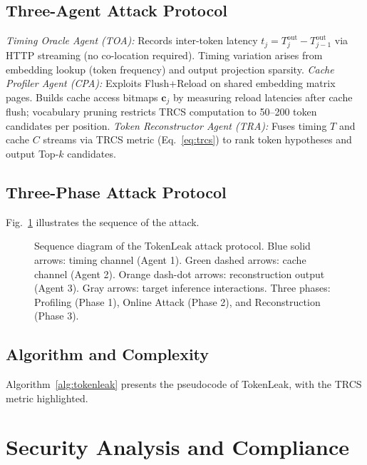 \documentclass[conference,10pt,twocolumn]{IEEEtran}
\begin{document}
\subsection{Three-Agent Attack Protocol}
\emph{Timing Oracle Agent (TOA):} Records inter-token latency $t_j = T_j^{\mathrm{out}} - T_{j-1}^{\mathrm{out}}$ via HTTP streaming (no co-location required). Timing variation arises from embedding lookup (token frequency) and output projection sparsity.
\emph{Cache Profiler Agent (CPA):} Exploits Flush+Reload on shared embedding matrix pages. Builds cache access bitmaps $\mathbf{c}_j$ by measuring reload latencies after cache flush; vocabulary pruning restricts TRCS computation to 50--200 token candidates per position.
\emph{Token Reconstructor Agent (TRA):} Fuses timing $T$ and cache $C$ streams via TRCS metric (Eq.~\ref{eq:trcs}) to rank token hypotheses and output Top-$k$ candidates.
\subsection{Three-Phase Attack Protocol}
Fig.~\ref{fig:sequence} illustrates the sequence of the attack.

\begin{figure}[!t]
\caption{Sequence diagram of the TokenLeak attack protocol. Blue solid
arrows: timing channel (Agent 1). Green dashed arrows: cache channel
(Agent 2). Orange dash-dot arrows: reconstruction output (Agent 3).
Gray arrows: target inference interactions. Three phases: Profiling
(Phase 1), Online Attack (Phase 2), and Reconstruction (Phase 3).}
\label{fig:sequence}
\resizebox{\columnwidth}{!}{}
\end{figure}

\subsection{Algorithm and Complexity}

Algorithm~\ref{alg:tokenleak} presents the pseudocode of TokenLeak,
with the TRCS metric highlighted.



\section{Security Analysis and Compliance}
\label{sec:security}
\end{document}
